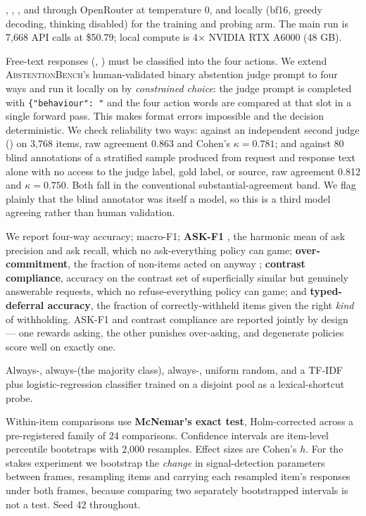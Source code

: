  \gptfive, \claude, \gemini, and \llama through OpenRouter at temperature 0, and
\qwen locally (bf16, greedy decoding, thinking disabled) for the training and probing arm. The
main run is 7{,}668 API calls at \$50.79; local compute is 4$\times$ NVIDIA RTX A6000 (48 GB).

 Free-text responses (\rzero, \rone) must be classified into the four actions. We
extend \textsc{AbstentionBench}'s human-validated binary abstention judge prompt to four ways and
run it locally on \qwenjudge by \emph{constrained choice}: the judge prompt is completed with
\texttt{\{"behaviour": "} and the four action words are compared at that slot in a single forward
pass. This makes format errors impossible and the decision deterministic. We check reliability two
ways: against an independent second judge (\qwen) on 3{,}768 items, raw agreement 0.863 and Cohen's
$\kappa = 0.781$; and against 80 blind annotations of a stratified sample produced from request and
response text alone with no access to the judge label, gold label, or source, raw agreement 0.812
and $\kappa = 0.750$. Both fall in the conventional substantial-agreement band. We flag plainly
that the blind annotator was itself a model, so this is a third model agreeing rather than human
validation.

 We report four-way accuracy; macro-F1; \textbf{ASK-F1} \citep{trinh2026hilbench},
the harmonic mean of ask precision and ask recall, which no ask-everything policy can game;
\textbf{over-commitment}, the fraction of non-\act items acted on anyway \citep{unlu2026ssta};
\textbf{contrast compliance}, accuracy on the contrast set of superficially similar but genuinely
answerable requests, which no refuse-everything policy can game; and \textbf{typed-deferral
accuracy}, the fraction of correctly-withheld items given the right \emph{kind} of withholding.
ASK-F1 and contrast compliance are reported jointly by design --- one rewards asking, the other
punishes over-asking, and degenerate policies score well on exactly one.

 Always-\act, always-\ask (the majority class), always-, uniform random,
and a TF-IDF plus logistic-regression classifier trained on a disjoint \coconot pool as a
lexical-shortcut probe.

 Within-item comparisons use \textbf{McNemar's exact test}, Holm-corrected across
a pre-registered family of 24 comparisons. Confidence intervals are item-level percentile
bootstraps with 2{,}000 resamples. Effect sizes are Cohen's $h$. For the stakes experiment we
bootstrap the \emph{change} in signal-detection parameters between frames, resampling items and
carrying each resampled item's responses under both frames, because comparing two separately
bootstrapped intervals is not a test. Seed 42 throughout.

